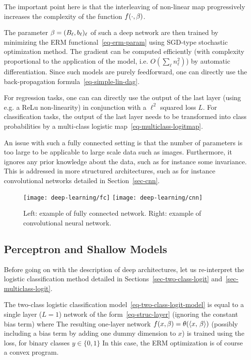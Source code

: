 The important point here is that the interleaving of non-linear map progressively increases the complexity of the function $f(\cdot,\beta)$.

The parameter $\beta = (B_\ell,b_\ell)_\ell$ of such a deep network are then trained by minimizing the ERM functional~\eqref{eq-erm-param} using SGD-type stochastic optimization method. The gradient can be computed efficiently (with complexity proportional to the application of the model, i.e. $O(\sum_\ell n_\ell^2)$) by automatic differentiation. Since such models are purely feedforward, one can directly use the back-propagation formula~\eqref{eq-simple-lin-dag}.

For regression tasks, one can can directly use the output of the last layer (using e.g. a ReLu non-linearity) in conjunction with a $\ell^2$ squared loss $L$.
%
For classification tasks, the output of the last layer needs to be transformed into class probabilities by a multi-class logistic map~\eqref{eq-multiclass-logitmap}.

An issue with such a fully connected setting is that the number of parameters is too large to be applicable to large scale data such as images. Furthermore, it ignores any prior knowledge about the data, such as for instance some invariance. This is addressed in more structured architectures, such as for instance convolutional networks detailed in Section~\ref{sec-cnn}. 


\begin{figure}
\texttt{[image: deep-learning/fc]} \quad
\texttt{[image: deep-learning/cnn]}
\caption{\label{fig-bgd}
Left: example of fully connected network.
Right: example of convolutional neural network.
}
\end{figure}


\subsection{Perceptron and Shallow Models}

Before going on with the description of deep architectures, let us re-interpret the logistic classification method detailed in Sections~\ref{sec-two-class-logit} and~\ref{sec-multiclass-logit}.

The two-class logistic classification model~\eqref{eq-two-class-logit-model} is equal to a single layer ($L=1$) network of the form~\eqref{eq-struc-layer} (ignoring the constant bias term) where 
The resulting one-layer network $f(x,\beta) = \theta(\langle x,\,\beta\rangle)$ (possibly including a bias term by adding one dummy dimension to $x$) is trained using the loss, for binary classes $y \in \{0,1\}$ 
In this case, the ERM optimization is of course a convex program. 

